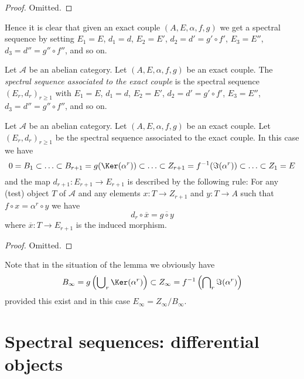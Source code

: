 \begin{proof}
Omitted.
\end{proof}

\noindent
Hence it is clear that given an exact couple $(A, E, \alpha, f, g)$
we get a spectral sequence by setting $E_1 = E$, $d_1 = d$,
$E_2 = E'$, $d_2 = d' = g' \circ f'$, $E_3 = E''$, $d_3 = d'' = g'' \circ f''$,
and so on.

\begin{definition}
\label{definition-spectral-sequence-associated-exact-couple}
Let $\mathcal{A}$ be an abelian category.
Let $(A, E, \alpha, f, g)$ be an exact couple.
The {\it spectral sequence associated to the exact couple}
is the spectral sequence $(E_r, d_r)_{r \geq 1}$ with
$E_1 = E$, $d_1 = d$, $E_2 = E'$, $d_2 = d' = g' \circ f'$,
$E_3 = E''$, $d_3 = d'' = g'' \circ f''$,
and so on.
\end{definition}

\begin{lemma}
\label{lemma-spectral-sequence-associated-exact-couple}
Let $\mathcal{A}$ be an abelian category.
Let $(A, E, \alpha, f, g)$ be an exact couple.
Let $(E_r, d_r)_{r \geq 1}$ be the spectral sequence
associated to the exact couple.
In this case we have
$$
0 = B_1 \subset \ldots \subset
B_{r + 1} = g(\Ker(\alpha^r))
\subset \ldots \subset
Z_{r + 1} = f^{-1}(\Im(\alpha^r))
\subset \ldots \subset Z_1 = E
$$
and the map $d_{r + 1} : E_{r + 1} \to E_{r + 1}$
is described by the following rule:
For any (test) object $T$ of $\mathcal{A}$ and any elements
$x : T \to Z_{r + 1}$ and $y : T \to A$ such that
$f \circ x = \alpha^r \circ y$ we have
$$
d_r \circ \overline{x} = \overline{g \circ y}
$$
where $\overline{x} : T \to E_{r + 1}$ is the
induced morphism.
\end{lemma}

\begin{proof}
Omitted.
\end{proof}

\noindent
Note that in the situation of the lemma we obviously have
$$
B_\infty = g\left(\bigcup\nolimits_r \Ker(\alpha^r)\right)
\subset
Z_\infty = f^{-1}\left(\bigcap\nolimits_r \Im(\alpha^r)\right)
$$
provided this exist and in this case $E_\infty = Z_\infty / B_\infty$.






\section{Spectral sequences: differential objects}
\label{section-differential-object}

